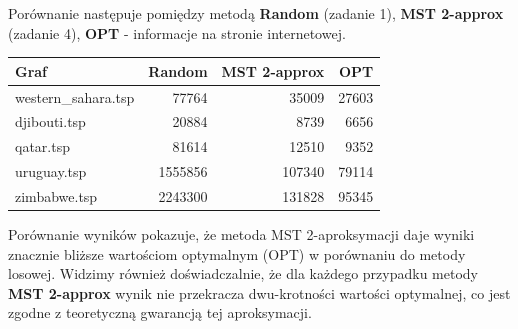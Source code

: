 \documentclass{article}
\begin{document}
Porównanie następuje pomiędzy metodą \textbf{Random} (zadanie 1), \textbf{MST 2-approx} (zadanie 4), \textbf{OPT} - informacje na stronie internetowej.

\begin{longtable}{|l|r|r|r|}
\hline
\textbf{Graf} & \textbf{Random} & \textbf{MST 2-approx} & \textbf{OPT} \\ \hline
western\_sahara.tsp & 77764 & 35009 & 27603 \\ 
djibouti.tsp & 20884 & 8739 & 6656 \\ 
qatar.tsp & 81614 & 12510 & 9352 \\ 
uruguay.tsp & 1555856 & 107340 & 79114 \\ 
zimbabwe.tsp & 2243300 & 131828 & 95345 \\ \hline
\end{longtable}
\noindent

Porównanie wyników pokazuje, że metoda MST 2-aproksymacji daje wyniki znacznie bliższe wartościom optymalnym (OPT) w porównaniu do metody losowej.
Widzimy również doświadczalnie, że dla każdego przypadku metody \textbf{MST 2-approx} wynik nie przekracza dwu-krotności wartości optymalnej,
co jest zgodne z teoretyczną gwarancją tej aproksymacji.
\end{document}
